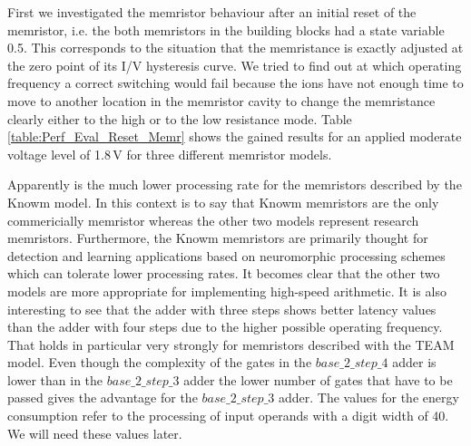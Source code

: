 \documentclass[pageno]{jpaper}
\begin{document}
First we investigated the memristor behaviour after an initial reset of the memristor, i.e. the both memristors in the building blocks had a state variable 0.5. This corresponds to the situation that the memristance is exactly adjusted at the zero point of its I/V hysteresis curve. We tried to find out at which operating frequency a correct switching would fail because the ions have not enough time to move to another location in the memristor cavity to change the memristance clearly either to the high or to the low resistance mode. Table \ref{table:Perf_Eval_Reset_Memr} shows the gained results for an applied moderate voltage level of 1.8\,V for three different memristor models. 

Apparently is the much lower processing rate for the memristors described by the Knowm model. In this context is to say that Knowm memristors are the only commericially memristor whereas the other two models represent research memristors. Furthermore, the Knowm memristors are primarily thought for detection and learning applications based on neuromorphic processing schemes which can tolerate lower processing rates. It becomes clear that the other two models are more appropriate for implementing high-speed arithmetic. It is also interesting to see that the adder with three steps shows better latency values than the adder with four steps due to the higher possible operating frequency. That holds in particular very strongly for memristors described with the TEAM model. Even though the complexity of the gates in the $base\_2\_step\_4$ adder is lower than in the $base\_2\_step\_3$ adder the lower number of gates that have to be passed gives the advantage for the $base\_2\_step\_3$ adder. The values for the energy consumption refer to the processing of input operands with a digit width of 40. We will need these values later.
\end{document}
